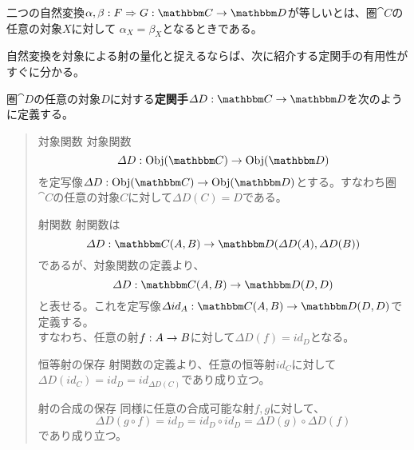   \begin{define}[自然変換の同一性]
    二つの自然変換$\natf{\alpha,\beta}{F}{G}{C}{D}$が等しいとは、圏$\cat{C}$の任意の対象$X$に対して
    $\alpha_X=\beta_X$となるときである。
  \end{define}

  自然変換を対象による射の量化と捉えるならば、次に紹介する定関手の有用性がすぐに分かる。
  \begin{define}[定関手]
    圏$\cat{D}$の任意の対象$D$に対する\textbf{定関手}$\functor{\varDelta D}{C}{D}$を次のように定義する。
    \begin{quote}
			\begin{mydescription}
				\item[対象関数] 対象関数\[\mor{\varDelta D}{\obj{C}}{\obj{D}}\]
				を定写像$\mor{\varDelta D}{\obj{C}}{\obj{D}}$とする。すなわち圏$\cat{C}$の任意の対象$C$に対して$\varDelta D(C)=D$である。
				\item[射関数] 
        射関数は\[\mor{\varDelta D}{\arset{C}{A}{B}}{\arset{D}{\varDelta D(A)}{\varDelta D(B)}}\]であるが、対象関数の定義より、\[\mor{\varDelta D}{\arset{C}{A}{B}}{\arset{D}{D}{D}}\]と表せる。これを定写像$\mor{\varDelta id_A}{\arset{C}{A}{B}}{\arset{D}{D}{D}}$で定義する。\\
        すなわち、任意の射$f:A\rightarrow B$に対して$\varDelta D (f)=id_D$となる。
				\item[恒等射の保存] 射関数の定義より、任意の恒等射$id_C$に対して$\varDelta D (id_C)=id_D=id_{\varDelta D(C)}$であり成り立つ。
				\item[射の合成の保存] 同様に任意の合成可能な射$f,g$に対して、\[\varDelta D (g\circ f)=id_D=id_D\circ id_D=\varDelta D (g)\circ \varDelta D (f)\]であり成り立つ。
			\end{mydescription}
		\end{quote}
    \begin{center}
    \end{center}
  \end{define}

